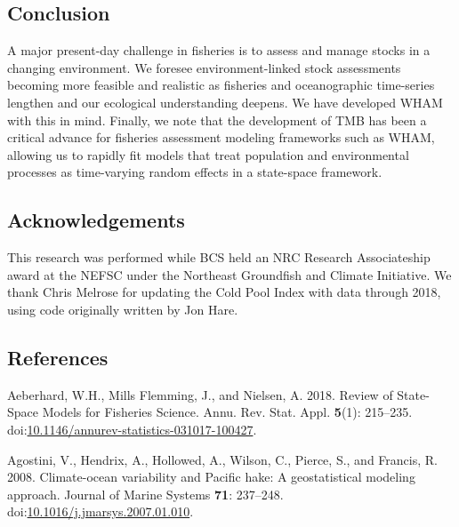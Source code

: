 \documentclass[]{article}
\begin{document}
\hypertarget{conclusion}{%
\subsection{Conclusion}\label{conclusion}}

A major present-day challenge in fisheries is to assess and manage
stocks in a changing environment. We foresee environment-linked stock
assessments becoming more feasible and realistic as fisheries and
oceanographic time-series lengthen and our ecological understanding
deepens. We have developed WHAM with this in mind. Finally, we note that
the development of TMB has been a critical advance for fisheries
assessment modeling frameworks such as WHAM, allowing us to rapidly fit
models that treat population and environmental processes as time-varying
random effects in a state-space framework.

\hypertarget{acknowledgements}{%
\subsection*{Acknowledgements}\label{acknowledgements}}

This research was performed while BCS held an NRC Research Associateship
award at the NEFSC under the Northeast Groundfish and Climate
Initiative. We thank Chris Melrose for updating the Cold Pool Index with
data through 2018, using code originally written by Jon Hare.

\pagebreak

\hypertarget{references}{%
\subsection*{References}\label{references}}

\hypertarget{refs}{}
\leavevmode\hypertarget{ref-aeberhard2018Review}{}%
Aeberhard, W.H., Mills Flemming, J., and Nielsen, A. 2018. Review of
State-Space Models for Fisheries Science. Annu. Rev. Stat. Appl.
\textbf{5}(1): 215--235.
doi:\href{https://doi.org/10.1146/annurev-statistics-031017-100427}{10.1146/annurev-statistics-031017-100427}.

\leavevmode\hypertarget{ref-agostini2008Climateocean}{}%
Agostini, V., Hendrix, A., Hollowed, A., Wilson, C., Pierce, S., and
Francis, R. 2008. Climate-ocean variability and Pacific hake: A
geostatistical modeling approach. Journal of Marine Systems \textbf{71}:
237--248.
doi:\href{https://doi.org/10.1016/j.jmarsys.2007.01.010}{10.1016/j.jmarsys.2007.01.010}.
\end{document}
